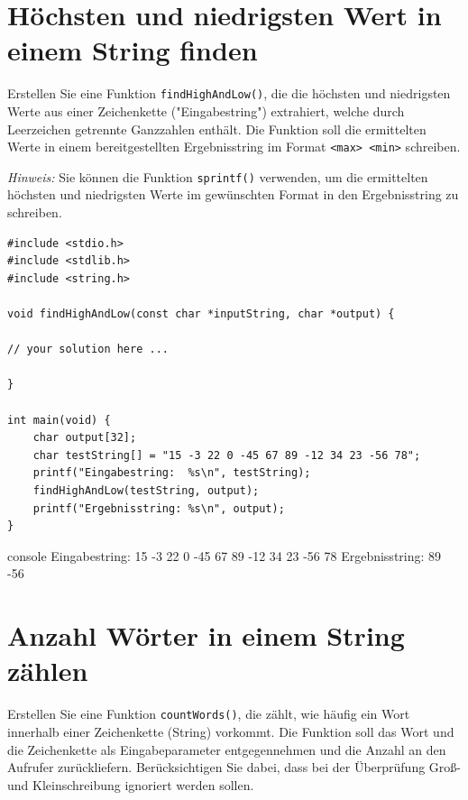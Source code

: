 \chapter{Höchsten und niedrigsten Wert in einem String finden}

\vspace{10pt}

Erstellen Sie eine Funktion \texttt{findHighAndLow()}, die die höchsten
und niedrigsten Werte aus einer Zeichenkette ("Eingabestring") extrahiert,
welche durch Leerzeichen getrennte Ganzzahlen enthält. Die Funktion soll die
ermittelten Werte in einem bereitgestellten Ergebnisstring im Format
\texttt{<max> <min>} schreiben.

\textit{Hinweis:} Sie können die Funktion \texttt{sprintf()} verwenden,
um die ermittelten höchsten und niedrigsten Werte im gewünschten Format in den
Ergebnisstring zu schreiben.

\Vorlage
\begin{verbatim}
#include <stdio.h>
#include <stdlib.h>
#include <string.h>

void findHighAndLow(const char *inputString, char *output) {

// your solution here ...

}

int main(void) {
    char output[32];
    char testString[] = "15 -3 22 0 -45 67 89 -12 34 23 -56 78";
    printf("Eingabestring:  %s\n", testString);
    findHighAndLow(testString, output);
    printf("Ergebnisstring: %s\n", output);
}
\end{verbatim}

\begin{mybox}[title=Bildschirmausgabe]{console}
Eingabestring:  15 -3 22 0 -45 67 89 -12 34 23 -56 78
Ergebnisstring: 89 -56
\end{mybox}




\chapter{Anzahl Wörter in einem String zählen}

\vspace{10pt}

Erstellen Sie eine Funktion \texttt{countWords()}, die zählt, wie häufig
ein Wort innerhalb einer Zeichenkette (String) vorkommt. Die Funktion soll das
Wort und die Zeichenkette als Eingabeparameter entgegennehmen und die Anzahl an
den Aufrufer zurückliefern. Berücksichtigen Sie dabei, dass bei der Überprüfung
Groß- und Kleinschreibung ignoriert werden sollen.

